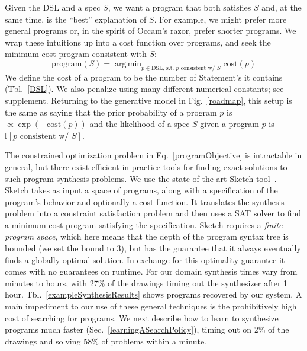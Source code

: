 \documentclass{article}
\DeclareMathOperator*{\argmin}{arg\,min} %
\newcommand{\indicator}{\mathds{I}} %
\newcommand{\remark}[1]{\textcolor{red}{[#1]}}
\theoremstyle{definition}
\begin{document}
Given the DSL and a spec $S$, we want a program that both satisfies $S$
and, at the same time, is the ``best'' explanation of $S$.
For example, we might prefer more general programs or, in the spirit of Occam's razor,
prefer shorter programs.
We wrap these intuitions up into a cost function over programs,
and seek the minimum cost program consistent with $S$:
\begin{equation}
  \text{program}(S) = \argmin_{p\in \text{DSL, s.t. }p \text{ consistent w/ } S} \text{cost}(p)\label{programObjective}
\end{equation}
We define the
cost of a program to be the number of Statement's it contains (Tbl.~\ref{DSL}).
We also penalize using many different numerical constants; see supplement.
Returning to the generative model in Fig.~\ref{roadmap},
this setup is the same as saying that the prior probability of a program $p$ is $\propto \exp\left(-\text{cost}(p) \right)$ and the likelihood of a spec $S$ given a program $p$ is $\indicator[p\text{ consistent w/ }S]$.

The constrained optimization problem in
Eq.~\ref{programObjective} is intractable in general, but there
exist efficient-in-practice tools for finding exact solutions to such
program synthesis problems. We use the state-of-the-art Sketch
tool~\citep{solar2008program}.
Sketch takes as input a space of programs, along with
a specification of the program's behavior and optionally a cost
function.  It translates the synthesis problem into a constraint
satisfaction problem and then uses a SAT solver to find a minimum-cost
program satisfying the specification.  Sketch requires a
 \emph{finite program space}, which here means that the depth of the
program syntax tree is bounded (we set the bound to 3),
but has the guarantee that it 
always eventually finds a globally optimal solution.
In exchange for this optimality guarantee
it comes with no guarantees
on runtime.
For our domain synthesis times vary from minutes to hours,
with 27\% of the drawings timing out the synthesizer after 1 hour.
Tbl.~\ref{exampleSynthesisResults} shows programs recovered by our system.
A main impediment to our use of these general techniques is
the prohibitively high cost of searching for programs.
We next describe how to learn to synthesize programs much faster (Sec.~\ref{learningASearchPolicy}),
timing out on 2\% of the drawings and solving 58\% of problems within a minute.
\end{document}
